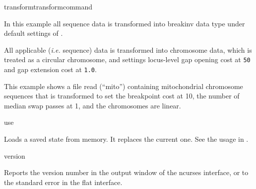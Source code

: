 \begin{command}{transform}{transformcommand}
\begin{poyexamples}
            
           
          {In this example all sequence data is transformed into breakinv data
          type under default settings of .}
          
          {All applicable (\emph{i.e.} sequence) data is transformed into chromosome
          data, which is treated as a circular chromosome, and settings locus-level gap
          opening cost at \texttt{50} and gap extension cost at \texttt{1.0}.}
              
              {This example shows a file read (``mito'') containing
              mitochondrial chromosome sequences that is transformed to set the
              breakpoint cost at 10, the number of median swap passes at 1, and
              the chromosomes are linear. }
            
	\end{poyexamples}	    

\end{command}


\begin{command}{use}{}

	\syntax{\obligatory{(\poystring)}}

	\begin{poydescription}
         Loads a saved \poy state from memory. It replaces the current one. See
         the usage in .
	\end{poydescription}

    \begin{poyalso}
    \end{poyalso}

\end{command}

\begin{command}{version}{}

	\syntax{\obligatory{()}}

	\begin{poydescription}
            Reports the \poy version number in the output window of the ncurses
            interface, or to the standard error in the flat interface.
	\end{poydescription}

    \begin{poyexamples}
    \end{poyexamples}
\end{command}


